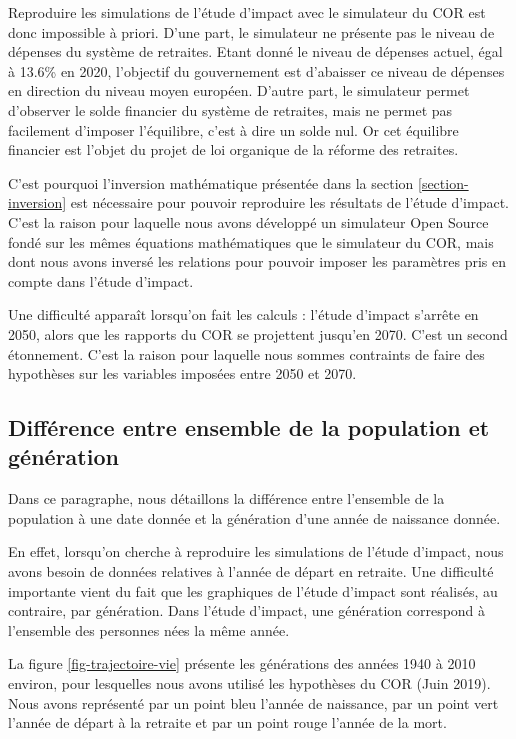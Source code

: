 \documentclass[10pt]{article}
\begin{document}
Reproduire les simulations de l'étude d'impact avec le simulateur du COR 
est donc impossible à priori. 
D'une part, le simulateur ne présente pas le niveau de dépenses du système 
de retraites. 
Etant donné le niveau de dépenses actuel, égal à 13.6\% en 2020, 
l'objectif du gouvernement est d'abaisser ce niveau de dépenses 
en direction du niveau moyen européen. 
D'autre part, le simulateur permet d'observer le solde financier du système de retraites, 
mais ne permet pas facilement d'imposer l'équilibre, c'est à dire un solde nul. 
Or cet équilibre financier est l'objet du projet de loi organique de la réforme 
des retraites. 

C'est pourquoi l'inversion mathématique présentée dans la section \ref{section-inversion} 
est nécessaire pour pouvoir reproduire les résultats de l'étude d'impact. 
C'est la raison pour laquelle nous avons développé un simulateur Open Source 
\cite{SimulateurScherrer} fondé sur les mêmes équations mathématiques 
que le simulateur du COR, mais dont nous avons inversé les relations pour 
pouvoir imposer les paramètres pris en compte dans l'étude d'impact. 

Une difficulté apparaît lorsqu'on fait les calculs : 
l'étude d'impact s'arrête en 2050, alors que les rapports du COR 
se projettent jusqu'en 2070. 
C'est un second étonnement. 
C'est la raison pour laquelle nous sommes contraints de faire des 
hypothèses sur les variables imposées entre 2050 et 2070. 


\subsection{Différence entre ensemble de la population et génération}

Dans ce paragraphe, nous détaillons la différence entre 
l'ensemble de la population à une date donnée et la génération d'une année 
de naissance donnée. 

En effet, lorsqu'on cherche à reproduire les simulations de l'étude d'impact, nous 
avons besoin de données relatives à l'année de départ en retraite. 
Une difficulté importante vient du fait que les graphiques de l'étude 
d'impact sont réalisés, au contraire, par génération. 
Dans l'étude d'impact, une génération correspond à l'ensemble des personnes 
nées la même année. 

La figure \ref{fig-trajectoire-vie} présente les générations des années 1940 
à 2010 environ, pour lesquelles nous avons utilisé les hypothèses du COR (Juin 2019).
Nous avons représenté par un point bleu l'année de naissance, par un point 
vert l'année de départ à la retraite et par un point rouge l'année de la 
mort. 
\end{document}

